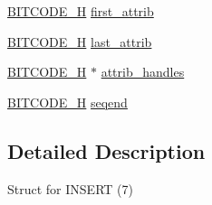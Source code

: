 \begin{DoxyCompactItemize}
\item 
\hyperlink{dwg_8h_a7c700e94e047a97ba8c24bdfe4029dc3}{\-B\-I\-T\-C\-O\-D\-E\-\_\-\-H} \hyperlink{struct__dwg__entity__INSERT_a722264352f64d88ca517865633841691}{first\-\_\-attrib}
\item 
\hyperlink{dwg_8h_a7c700e94e047a97ba8c24bdfe4029dc3}{\-B\-I\-T\-C\-O\-D\-E\-\_\-\-H} \hyperlink{struct__dwg__entity__INSERT_a4f91986dff93db23fb4fb3680f4348da}{last\-\_\-attrib}
\item 
\hyperlink{dwg_8h_a7c700e94e047a97ba8c24bdfe4029dc3}{\-B\-I\-T\-C\-O\-D\-E\-\_\-\-H} $\ast$ \hyperlink{struct__dwg__entity__INSERT_a9350943b0de5a2f3882e8d5a516faa0e}{attrib\-\_\-handles}
\item 
\hyperlink{dwg_8h_a7c700e94e047a97ba8c24bdfe4029dc3}{\-B\-I\-T\-C\-O\-D\-E\-\_\-\-H} \hyperlink{struct__dwg__entity__INSERT_ababaf270eafdcbb76c555e5bba39072d}{seqend}
\end{DoxyCompactItemize}


\subsection{\-Detailed \-Description}
\-Struct for \-I\-N\-S\-E\-R\-T (7) 


